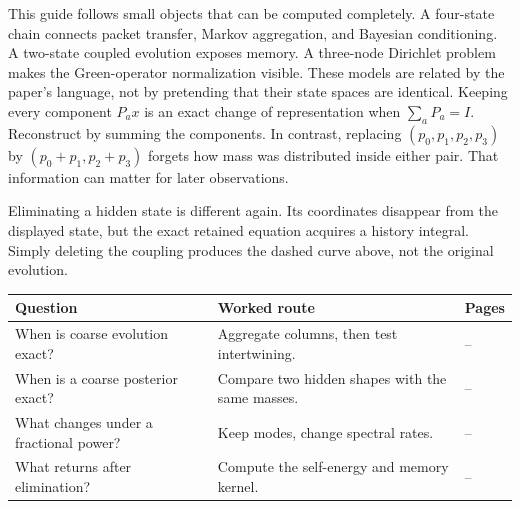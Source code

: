 This guide follows small objects that can be computed completely. A four-state chain connects packet transfer, Markov aggregation, and Bayesian conditioning. A two-state coupled evolution exposes memory. A three-node Dirichlet problem makes the Green-operator normalization visible. These models are related by the paper's language, not by pretending that their state spaces are identical.
Keeping every component $P_a x$ is an exact change of representation when $\sum_aP_a=I$. Reconstruct by summing the components. In contrast, replacing $(p_0,p_1,p_2,p_3)$ by $(p_0+p_1,p_2+p_3)$ forgets how mass was distributed inside either pair. That information can matter for later observations.

Eliminating a hidden state is different again. Its coordinates disappear from the displayed state, but the exact retained equation acquires a history integral. Simply deleting the coupling produces the dashed curve above, not the original evolution.
\begin{center}\small
\begin{tabularx}{\linewidth}{@{}lYl@{}}\toprule
Question & Worked route & Pages\\\midrule
When is coarse evolution exact? & Aggregate columns, then test intertwining. & --\\
When is a coarse posterior exact? & Compare two hidden shapes with the same masses. & --\\
What changes under a fractional power? & Keep modes, change spectral rates. & --\\
What returns after elimination? & Compute the self-energy and memory kernel. & --\\\bottomrule
\end{tabularx}\end{center}

